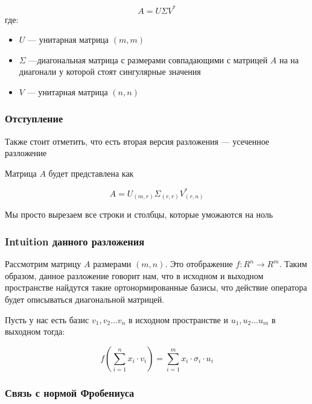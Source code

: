 \documentclass{article}
\begin{document}
    \begin{equation}
        A = U \Sigma V^{*}
    \end{equation}
    где: 

    \begin{itemize}
        \item $U$ --- унитарная матрица $(m, m)$
        \item $\Sigma$ ---диагональная матрица с размерами совпадающими с матрицей $A$ на 
        на диагонали у которой стоят сингулярные значения 
        \item $V$ --- унитарная матрица $(n, n)$
    \end{itemize}

    \subsubsection{Отступление}


    Также стоит отметить, что есть вторая версия разложения --- усеченное разложение

    Матрица $A$ будет представлена как 

    \begin{equation}
        A = U_{(m, r)} \Sigma_{(r, r)} V^{*}_{(r, n)}
    \end{equation}

    Мы просто вырезаем все строки и столбцы, которые уможаются на ноль


    \subsubsection{Intuition данного разложения}


    Рассмотрим матрицу $A$ размерами $(m, n)$. Это отображение $f:R^{n} \rightarrow R^{m}$. 
    Таким образом, данное разложение говорит нам, что в исходном и выходном пространстве найдутся такие ортонормированные базисы, что действие оператора 
    будет описываться диагональной матрицей.

    \quad 

    Пусть у нас есть базис $v_{1}, v_{2} ... v_{n}$ в исходном пространстве и $u_{1}, u_{2} ... u_{m}$ в выходном тогда: 

    \begin{equation}
        f(\sum_{i = 1}^{n}{x_{i} \cdot v_{i}}) = \sum_{i = 1}^{m}{x_{i} \cdot \sigma_{i} \cdot u_{i}}
    \end{equation}

    \subsubsection{Связь с нормой Фробениуса}
\end{document}
